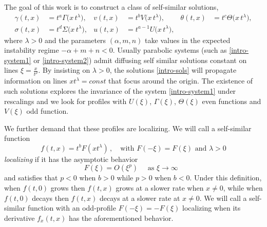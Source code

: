 \documentclass[usletter,11pt]{article}
\def\BO{{{O}}}
\theoremstyle{remark}
\begin{document}
The goal of this work is to construct a class of self-similar solutions, 
\begin{equation} \label{intro-sols}
\begin{aligned}
 \gamma (t,x) &= t^a\Gamma\big( x \, t^\lambda \big), & v (t,x) &= t^bV\big( x \, t^\lambda \big), & \theta (t,x) &= t^c\Theta\big( x \, t^\lambda \big),\\
 {\sigma}(t,x) &= t^d\Sigma\big( x \, t^\lambda \big), & u(t,x) &= t^{a-1}U\big( x \, t^\lambda \big), 
\end{aligned}
\end{equation}
where $\lambda > 0$ and the parameters $(\alpha, m, n)$ take values in the expected instability regime $-\alpha+m+n<0$.
Usually parabolic systems (such as \eqref{intro-system1} or \eqref{intro-system2}) admit diffusing self similar solutions constant on lines $\xi = \frac{x}{t^\rho}$. By insisting on $\lambda >0$,
the solutions \eqref{intro-sols} will  propagate information on lines $x t^\lambda = const$ that focus around the origin. 
The existence of such solutions explores the invariance of the system \eqref{intro-system1} under rescalings and we look for profiles with
$U(\xi)$, $\Gamma(\xi)$, $\Theta(\xi)$ even functions and $V(\xi)$ odd function. 


We further demand that these profiles are localizing. We will call a self-similar function 
$$
f(t,x) = t^b F(x t^\lambda) \, , \quad \mbox{with $F(-\xi) = F(\xi)$ and $\lambda > 0$}
$$
{\it localizing} if it has the asymptotic behavior
$$
F(\xi) = \BO (\xi^p)    \quad \mbox{ as $\xi \to \infty$ }
$$
and satisfies that $p < 0$ when $b > 0$ while $p > 0$ when $b < 0$. Under this definition, when $f(t,0)$ grows then $f(t,x)$ grows at a slower
rate when $x \ne 0$, while when $f(t,0)$ decays then $f(t,x)$ decays at a slower rate at $x \ne 0$. We will call a self-similar function with an odd-profile 
$F(-\xi) = -F(\xi)$ localizing when its derivative $f_x( t,x)$ has the aforementioned behavior.
\end{document}
